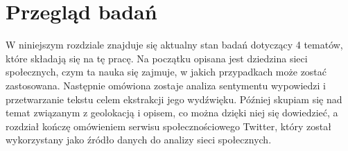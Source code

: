 \chapter{Przegląd badań}

W niniejszym rozdziale znajduje się aktualny stan badań dotyczący 4 tematów,
które składają się na tę pracę. Na początku opisana jest dziedzina sieci
społecznych, czym ta nauka się zajmuje, w jakich przypadkach może zostać
zastosowana.
Następnie omówiona zostaje analiza sentymentu wypowiedzi i przetwarzanie tekstu
celem ekstrakcji jego wydźwięku.
Później skupiam się nad temat związanym z geolokacją i opisem, co można dzięki
niej się dowiedzieć, a rozdział kończę omówieniem serwisu społecznościowego Twitter,
który został wykorzystany jako źródło danych do analizy sieci społecznych.








